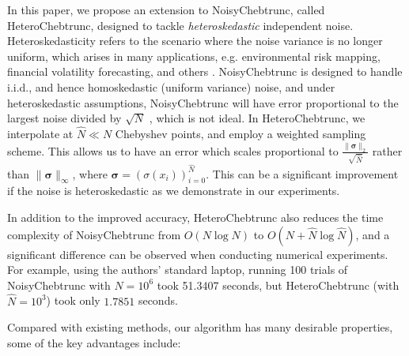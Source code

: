 \documentclass[pdflatex,sn-mathphys-num]{sn-jnl}%
\theoremstyle{thmstyleone}%
\theoremstyle{thmstyletwo}%
\theoremstyle{thmstylethree}%
\begin{document}
In this paper, we propose an extension to NoisyChebtrunc, called HeteroChebtrunc, designed to tackle \emph{heteroskedastic} independent noise. Heteroskedasticity refers to the scenario where the noise variance is no longer uniform, which arises in many applications, e.g. environmental risk mapping, financial volatility forecasting, and others \cite{envi-risk,volatility-forecast}. NoisyChebtrunc is designed to handle i.i.d., and hence homoskedastic (uniform variance) noise, and under heteroskedastic assumptions, NoisyChebtrunc will have error proportional to the largest noise divided by $\sqrt{N}$ \cite{yuji}, which is not ideal. In HeteroChebtrunc, we interpolate at $\hat{N} \ll N$ Chebyshev points, and employ a weighted sampling scheme. This allows us to have an error which scales proportional to $\frac{\|\bm{\sigma}\|_2}{\sqrt{\hat{N}}}$ rather than $\|\bm{\sigma}\|_\infty$, where $\bm{\sigma} = (\sigma(x_i))_{i=0}^{\hat{N}}$. This can be a significant improvement if the noise is heteroskedastic as we demonstrate in our experiments.


In addition to the improved accuracy, HeteroChebtrunc also reduces the time complexity of NoisyChebtrunc from $O(N\log N)$ to $O(N+\hat{N}\log \hat{N})$, and a significant difference can be observed when conducting numerical experiments. For example, using the authors' standard laptop, running 100 trials of NoisyChebtrunc with $N = 10^6$ took 51.3407 seconds, but HeteroChebtrunc (with $\hat{N} = 10^3$) took only $1.7851$ seconds. 

Compared with existing methods, our algorithm has many desirable properties, some of the key advantages include:
\end{document}
